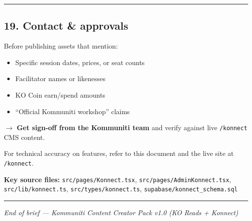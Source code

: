\documentclass[11pt,a4paper]{report}
\begin{document}
\medskip\hrule\medskip

\subsection{19. Contact \& approvals}

Before publishing assets that mention:

\begin{itemize}
  \item Specific session dates, prices, or seat counts
  \item Facilitator names or likenesses
  \item KO Coin earn/spend amounts
  \item “Official Kommuniti workshop” claims
\end{itemize}

$\rightarrow$ \textbf{Get sign-off from the Kommuniti team} and verify against live \texttt{/konnect} CMS content.


For technical accuracy on features, refer to this document and the live site at \texttt{/konnect}.


\textbf{Key source files:} \texttt{src/pages/Konnect.tsx}, \texttt{src/pages/AdminKonnect.tsx}, \texttt{src/lib/konnect.ts}, \texttt{src/types/konnect.ts}, \texttt{supabase/konnect\_schema.sql}


\medskip\hrule\medskip

\textit{End of brief --- Kommuniti Content Creator Pack v1.0 (KO Reads + Konnect)}
\end{document}
